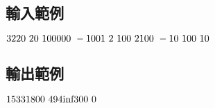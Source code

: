 \documentclass{article}
\begin{document}
\begin{CJK*}{UTF8}{bsmi}
\subsection*{輸入範例}
$3\\220\ 20\ 100000\ -100\\1\ 2\ 100\ 2\\100\ -10\ 100\ 10$

\subsection*{輸出範例}
$15331800\ 494\\\text{inf}\\300\ 0$

\end{CJK*}
\end{document}
